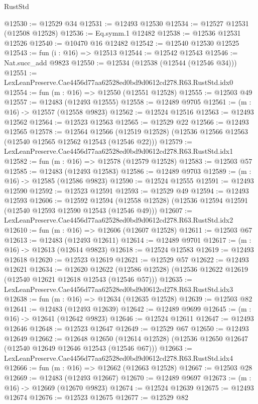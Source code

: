 \begin{lexlean}{RustStd}
\begin{coremodule}
@12530 := @12529 @34
@12531 := @12493 @12530
@12534 := @12527 @12531 (@12508 @12528)
@12536 := Eq.symm.{1} @12482
@12538 := @12536 @12531 @12526
@12540 := @10470 @16 @12482
@12542 := @12540 @12530 @12525
@12543 := fun (i : @16) => @12513
@12544 := @12542 @12543
@12546 := Nat.succ_add @9823
@12550 := @12534 (@12538 (@12544 (@12546 @34)))
@12551 := LexLeanPreserve.Cae4456d77aa62528ed0bd9d0612cd278.R63.RustStd.idx0
@12554 := fun (m : @16) => @12550 (@12551 @12528)
@12555 := @12503 @49
@12557 := @12483 (@12493 @12555)
@12558 := @12489 @9705
@12561 := (m : @16) -> @12557 (@12558 @9823)
@12562 := @12524 @12516
@12563 := @12493 @12562
@12564 := @12523 @12563
@12565 := @12529 @22
@12566 := @12493 @12565
@12578 := @12564
    @12566
    (@12519 @12528)
    (@12536 @12566 @12563 (@12540 @12565 @12562 @12543 (@12546 @22)))
@12579 := LexLeanPreserve.Cae4456d77aa62528ed0bd9d0612cd278.R63.RustStd.idx1
@12582 := fun (m : @16) => @12578 (@12579 @12528)
@12583 := @12503 @57
@12585 := @12483 (@12493 @12583)
@12586 := @12489 @9703
@12589 := (m : @16) -> @12585 (@12586 @9823)
@12590 := @12524 @12555
@12591 := @12493 @12590
@12592 := @12523 @12591
@12593 := @12529 @49
@12594 := @12493 @12593
@12606 := @12592
    @12594
    (@12558 @12528)
    (@12536 @12594 @12591 (@12540 @12593 @12590 @12543 (@12546 @49)))
@12607 := LexLeanPreserve.Cae4456d77aa62528ed0bd9d0612cd278.R63.RustStd.idx2
@12610 := fun (m : @16) => @12606 (@12607 @12528)
@12611 := @12503 @67
@12613 := @12483 (@12493 @12611)
@12614 := @12489 @9701
@12617 := (m : @16) -> @12613 (@12614 @9823)
@12618 := @12524 @12583
@12619 := @12493 @12618
@12620 := @12523 @12619
@12621 := @12529 @57
@12622 := @12493 @12621
@12634 := @12620
    @12622
    (@12586 @12528)
    (@12536 @12622 @12619 (@12540 @12621 @12618 @12543 (@12546 @57)))
@12635 := LexLeanPreserve.Cae4456d77aa62528ed0bd9d0612cd278.R63.RustStd.idx3
@12638 := fun (m : @16) => @12634 (@12635 @12528)
@12639 := @12503 @82
@12641 := @12483 (@12493 @12639)
@12642 := @12489 @9699
@12645 := (m : @16) -> @12641 (@12642 @9823)
@12646 := @12524 @12611
@12647 := @12493 @12646
@12648 := @12523 @12647
@12649 := @12529 @67
@12650 := @12493 @12649
@12662 := @12648
    @12650
    (@12614 @12528)
    (@12536 @12650 @12647 (@12540 @12649 @12646 @12543 (@12546 @67)))
@12663 := LexLeanPreserve.Cae4456d77aa62528ed0bd9d0612cd278.R63.RustStd.idx4
@12666 := fun (m : @16) => @12662 (@12663 @12528)
@12667 := @12503 @28
@12669 := @12483 (@12493 @12667)
@12670 := @12489 @9697
@12673 := (m : @16) -> @12669 (@12670 @9823)
@12674 := @12524 @12639
@12675 := @12493 @12674
@12676 := @12523 @12675
@12677 := @12529 @82

\end{coremodule}
\end{lexlean}
